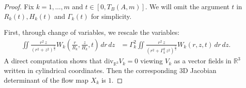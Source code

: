 \documentclass[reqno,11pt]{amsart}
\begin{document}
    \begin{proof}
    Fix $k=1,\ldots,m$ and $t\in [0,T_B(A,m)]$. We will omit the argument $t$ in $R_k(t), H_k(t)$ and $ \Gamma_k(t)$ for simplicity.
    
    First, through change of variables, we rescale the variables:
    \begin{align*}
        \iint \frac{r^2\, z}{(r^2+z^2)^{\frac{5}{2}}} 
        W_k \left( \frac{r}{R_k} , \frac{z}{H_k}, t \right) 
        \, dr \, dz 
    &=
        \Gamma_k^2\iint 
        \frac{r^2\, z}{\left( r^2+\Gamma_k^2 \, z^2 \right)^{\frac{5}{2}}} W_k (r,z,t)
        \, dr \, dz.
    \end{align*}
A direct computation shows that $\mathrm{div}_{\mathbb{R}^3}V_k =0$ viewing $V_k$ as a vector fields in $\mathbb{R}^3$ written in cylindrical coordinates. Then the corresponding 3D Jacobian determinant of the flow map $X_k$ is $1$.  



\end{proof}
\end{document}
